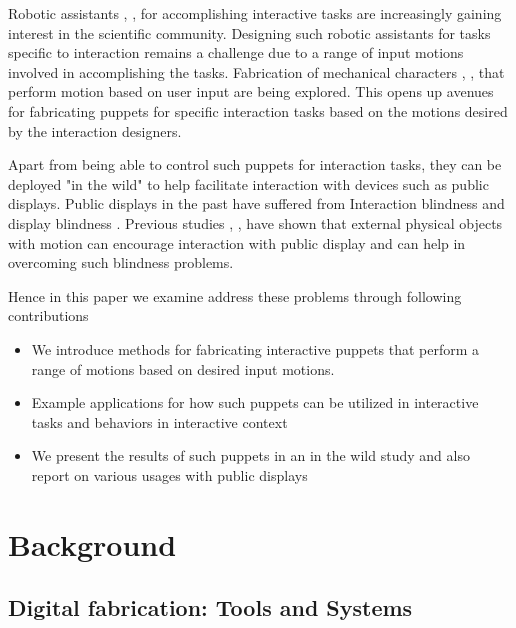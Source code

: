 \documentclass{sigchi}
\begin{document}
Robotic assistants \cite{somanath_spidey:_2012}, \cite{pedersen_tangible_2011}, \cite{somanath_integrating_2013} for accomplishing interactive tasks are increasingly gaining interest in the scientific community. Designing such robotic assistants for tasks specific to interaction remains a challenge due to a range of input motions involved in accomplishing the tasks. Fabrication of mechanical characters \cite{cali_3d-printing_2012}, \cite{skouras_computational_2013}, \cite{coros_computational_2013} that perform motion based on user input are being explored. This opens up avenues for fabricating puppets for specific interaction tasks based on the motions desired by the interaction designers. 

Apart from being able to control such puppets for interaction tasks, they can be deployed "in the wild" to help facilitate interaction with devices such as public displays. Public displays in the past have suffered from Interaction blindness \cite{} and display blindness \cite{}. Previous studies  \cite{ju_animate_2010}, \cite{Houben:2013:OIB:2468356.2468631}, \cite{breazeal_public_2002}  have shown that external physical objects with motion can encourage interaction with public display and can help in overcoming such blindness problems. 

Hence in this paper we examine address these problems through following contributions

\begin{itemize}

\item We introduce methods for fabricating interactive puppets that perform a range of motions based on desired input motions. 

\item Example applications for how such puppets can be utilized in interactive tasks and behaviors in interactive context

\item We present the results of such puppets in an in the wild study and also report on various usages with public displays 

\end{itemize}

 




\section{Background}


\subsection{Digital fabrication: Tools and Systems}

\subsection{}




\end{document}
